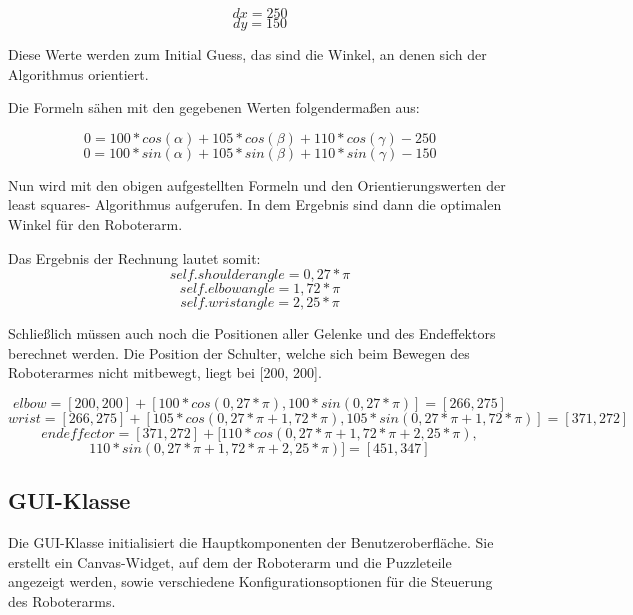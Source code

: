 \documentclass[12pt]{article}
\begin{document}
    \[
        dx = 250
    \]
    \[
        dy = 150
    \]

    Diese Werte werden zum Initial Guess, das sind die Winkel, an denen sich der Algorithmus
    orientiert.

    

    Die Formeln sähen mit den gegebenen Werten folgendermaßen aus:

    \[
        0 = 100 * cos(\alpha) + 105 * cos(\beta) + 110 * cos(\gamma) -250
    \]
    \[
        0 = 100 * sin(\alpha) + 105 * sin(\beta) + 110 * sin(\gamma) -150
    \]

    Nun wird mit den obigen aufgestellten Formeln und den Orientierungswerten der least squares-
    Algorithmus aufgerufen. In dem Ergebnis sind dann die optimalen Winkel für den Roboterarm.

    

    Das Ergebnis der Rechnung lautet somit:
    \[
        self.shoulderangle = 0,27 *\pi
    \]
    \[
        self.elbowangle = 1,72 *\pi
    \]
    \[
        self.wristangle = 2,25 *\pi
    \]

    Schließlich müssen auch noch die Positionen aller Gelenke und des Endeffektors berechnet werden.
    Die Position der Schulter, welche sich beim Bewegen des Roboterarmes nicht mitbewegt, liegt bei
    [200, 200].

    \[
        elbow = [200, 200] + [100 * cos(0,27 * \pi), 100 * sin(0,27*\pi)] = [266, 275]
    \]
    \[
        wrist = [266, 275] + [105 * cos(0,27 * \pi + 1,72 * \pi), 105 * sin(0,27*\pi + 1,72 * \pi)] = [371, 272]
    \]
    \[
        endeffector = [371, 272] + [ 110 * cos(0,27*\pi + 1,72*\pi + 2,25*\pi),
    \]
    \[
        110 * sin(0,27*\pi + 1,72*\pi + 2,25*\pi)] = [451, 347]
    \]

    

    \subsection{GUI-Klasse}
    Die GUI-Klasse initialisiert die Hauptkomponenten der Benutzeroberfläche. Sie erstellt ein Canvas-Widget,
    auf dem der Roboterarm und die Puzzleteile angezeigt werden, sowie verschiedene Konfigurationsoptionen für
    die Steuerung des Roboterarms.
\end{document}
